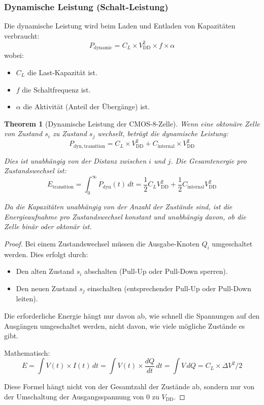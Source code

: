 \documentclass[12pt, a4paper]{article}
\newtheorem{theorem}{Theorem}[section]
\theoremstyle{definition}
\theoremstyle{remark}
\begin{document}
\subsubsection{Dynamische Leistung (Schalt-Leistung)}

Die dynamische Leistung wird beim Laden und Entladen von Kapazitäten verbraucht:
\[
P_{\mathrm{dynamic}} = C_L \times V_{\mathrm{DD}}^2 \times f \times \alpha
\]
wobei:
\begin{itemize}
  \item $C_L$ die Last-Kapazität ist.
  \item $f$ die Schaltfrequenz ist.
  \item $\alpha$ die Aktivität (Anteil der Übergänge) ist.
\end{itemize}

\begin{theorem}[Dynamische Leistung der CMOS-8-Zelle]
\label{thm:dynamische_leistung_cmos8}
Wenn eine oktonäre Zelle von Zustand $s_i$ zu Zustand $s_j$ wechselt, beträgt die dynamische Leistung:
\[
P_{\mathrm{dyn, transition}} = C_L \times V_{\mathrm{DD}}^2 + C_{\mathrm{internal}} \times V_{\mathrm{DD}}^2
\]

Dies ist unabhängig von der Distanz zwischen $i$ und $j$. Die Gesamtenergie pro Zustandswechsel ist:
\[
E_{\mathrm{transition}} = \int_0^{\infty} P_{\mathrm{dyn}}(t) \, dt = \frac{1}{2} C_L V_{\mathrm{DD}}^2 + \frac{1}{2} C_{\mathrm{internal}} V_{\mathrm{DD}}^2
\]

Da die Kapazitäten unabhängig von der Anzahl der Zustände sind, ist die Energieaufnahme pro Zustandswechsel konstant und unabhängig davon, ob die Zelle binär oder oktonär ist.
\end{theorem}

\begin{proof}
Bei einem Zustandswechsel müssen die Ausgabe-Knoten $Q_i$ umgeschaltet werden. Dies erfolgt durch:
\begin{itemize}
  \item Den alten Zustand $s_i$ abschalten (Pull-Up oder Pull-Down sperren).
  \item Den neuen Zustand $s_j$ einschalten (entsprechender Pull-Up oder Pull-Down leiten).
\end{itemize}

Die erforderliche Energie hängt nur davon ab, wie schnell die Spannungen auf den Ausgängen umgeschaltet werden, nicht davon, wie viele mögliche Zustände es gibt. 

Mathematisch:
\[
E = \int V(t) \times I(t) \, dt = \int V(t) \times \frac{dQ}{dt} \, dt = \int V \, dQ = C_L \times \Delta V^2 / 2
\]

Diese Formel hängt nicht von der Gesamtzahl der Zustände ab, sondern nur von der Umschaltung der Ausgangsspannung von 0 zu $V_{\mathrm{DD}}$.
\end{proof}
\end{document}
